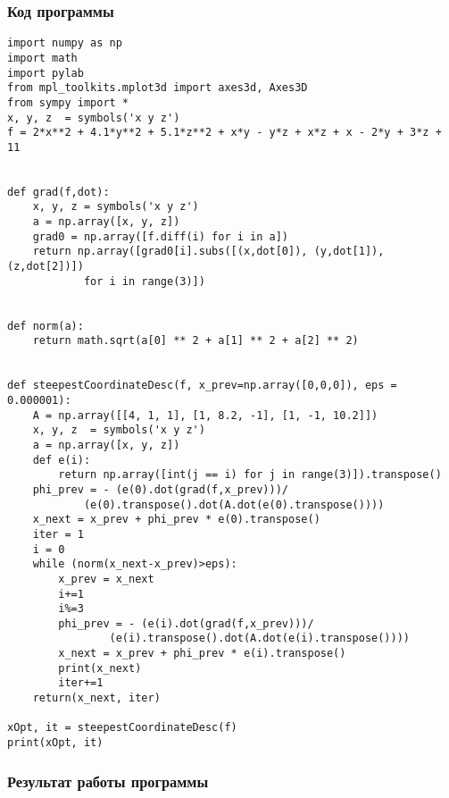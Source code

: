 \documentclass[12pt,a4paper]{article}
\begin{document}
\subsubsection{Код программы}
\begin{verbatim}
import numpy as np
import math
import pylab
from mpl_toolkits.mplot3d import axes3d, Axes3D
from sympy import *
x, y, z  = symbols('x y z')
f = 2*x**2 + 4.1*y**2 + 5.1*z**2 + x*y - y*z + x*z + x - 2*y + 3*z + 11


def grad(f,dot):
    x, y, z = symbols('x y z')
    a = np.array([x, y, z])
    grad0 = np.array([f.diff(i) for i in a])
    return np.array([grad0[i].subs([(x,dot[0]), (y,dot[1]), (z,dot[2])])
            for i in range(3)])


def norm(a):
    return math.sqrt(a[0] ** 2 + a[1] ** 2 + a[2] ** 2)


def steepestCoordinateDesc(f, x_prev=np.array([0,0,0]), eps = 0.000001):
    A = np.array([[4, 1, 1], [1, 8.2, -1], [1, -1, 10.2]])
    x, y, z  = symbols('x y z')
    a = np.array([x, y, z])
    def e(i):
        return np.array([int(j == i) for j in range(3)]).transpose()
    phi_prev = - (e(0).dot(grad(f,x_prev)))/
            (e(0).transpose().dot(A.dot(e(0).transpose())))
    x_next = x_prev + phi_prev * e(0).transpose()
    iter = 1
    i = 0
    while (norm(x_next-x_prev)>eps):
        x_prev = x_next
        i+=1
        i%=3
        phi_prev = - (e(i).dot(grad(f,x_prev)))/
                (e(i).transpose().dot(A.dot(e(i).transpose())))
        x_next = x_prev + phi_prev * e(i).transpose()
        print(x_next)
        iter+=1
    return(x_next, iter)

xOpt, it = steepestCoordinateDesc(f)
print(xOpt, it)

\end{verbatim}
\subsubsection{Результат работы программы}
\end{document}
